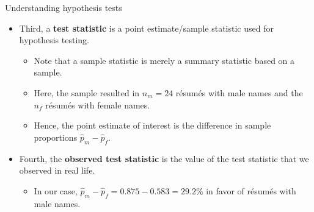 \documentclass[
  ignorenonframetext,
]{beamer}
\providecommand{\tightlist}{%
  \setlength{\itemsep}{0pt}\setlength{\parskip}{0pt}}
\begin{document}
\begin{frame}{Understanding hypothesis tests}
\label{understanding-hypothesis-tests-5}
\begin{itemize}
\item
  Third, a \textbf{test statistic} is a point estimate/sample statistic
  used for hypothesis testing.

  \begin{itemize}
  \tightlist
  \item
    Note that a sample statistic is merely a summary statistic based on
    a sample.
  \item
    Here, the sample resulted in \(n_m=24\) résumés with male names and
    the \(n_f\) résumés with female names.
  \item
    Hence, the point estimate of interest is the difference in sample
    proportions \(\hat{p}_m-\hat{p}_f\).
  \end{itemize}
\item
  Fourth, the \textbf{observed test statistic} is the value of the test
  statistic that we observed in real life.

  \begin{itemize}
  \tightlist
  \item
    In our case, \(\hat{p}_m-\hat{p}_f=0.875-0.583=29.2\%\) in favor of
    résumés with male names.
  \end{itemize}
\end{itemize}
\end{frame}
\end{document}
